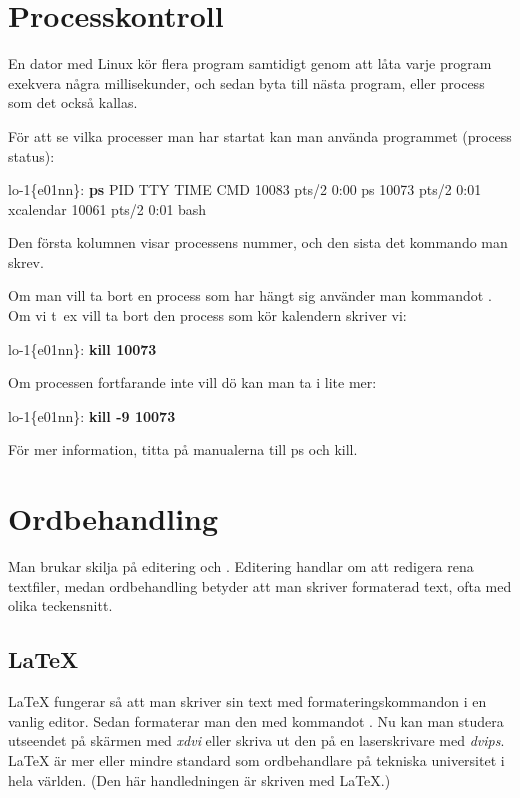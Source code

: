 \documentclass[a4paper,twocolumn]{book}
\begin{document}
\section{Processkontroll}

En dator med Linux kör flera program samtidigt genom
att låta varje program exekvera några millisekunder, och sedan byta
till nästa program, eller process som det också kallas.

För att se vilka processer man har startat kan man använda programmet
 (process status):
\begin{example}
lo-1\{e01nn\}: \textbf{ps}
   PID TTY      TIME CMD
 10083 pts/2    0:00 ps
 10073 pts/2    0:01 xcalendar
 10061 pts/2    0:01 bash
\end{example}
Den första kolumnen visar processens nummer, och den sista det
kommando man skrev.

Om man vill ta bort en process som har hängt sig använder man
kommandot . Om vi t~ex vill ta bort den process som kör
kalendern skriver vi:
\begin{example}
lo-1\{e01nn\}: \textbf{kill 10073}
\end{example}
Om processen fortfarande inte vill dö kan man ta i lite mer:
\begin{example}
lo-1\{e01nn\}: \textbf{kill -9 10073}
\end{example}
För mer information, titta på manualerna till ps och kill.

\section{Ordbehandling}

Man brukar skilja på editering och . Editering
handlar om att redigera rena textfiler, medan ordbehandling betyder
att man skriver formaterad text, ofta med olika teckensnitt.

\subsection{\LaTeX}

\LaTeX{} fungerar så
att man skriver sin text med formateringskommandon i en vanlig
editor. Sedan formaterar man den med kommandot . Nu
kan man studera utseendet på skärmen med \emph{xdvi} eller skriva ut
den på en laserskrivare med \emph{dvips}. \LaTeX{} är mer eller mindre
standard som ordbehandlare på tekniska universitet i hela världen.  (Den
här handledningen är skriven med \LaTeX.)
\end{document}
